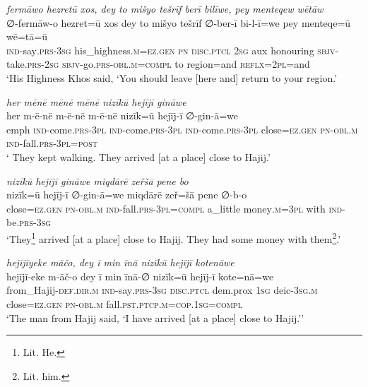 \ea \label{ŽP.91}
\textit{fermāwo hezretū xos, dey to mišyo tešrīf berī bilīwe, pey menteqew wētāw} \\ 
\gll ∅-fermāw-o hezret=ū xos dey to mišyo tešrīf ∅-ber-ī bi-l-ī=we pey menteqe=ū wē=tā=ū \\ 
 \textsc{ind-}say\textsc{.prs}\textsc{-3sg} his\_highness\textsc{.m}\textsc{\textsc{=ez.gen}} \textsc{pn} \textsc{disc.ptcl} \textsc{2sg} aux honouring \textsc{sbjv-}take\textsc{.prs}-\textsc{2sg} \textsc{sbjv-}go\textsc{.prs}\textsc{-obl}\textsc{.m}\textsc{=compl} to region=and \textsc{reflx}=\textsc{2pl}=and \\ 
\glt `His Highness Khos said, ‘You should leave [here and] return to your region.'
\z 
 
\ea \label{ŽP.100}
\textit{her mēnē mēnē mēnē nizīkū hejījī gināwe} \\ 
\gll her m-ē-nē m-ē-nē m-ē-nē nizīk=ū hejīj-ī ∅-gin-ā=we \\ 
 emph \textsc{ind-}come\textsc{.prs}\textsc{-3pl} \textsc{ind-}come\textsc{.prs}\textsc{-3pl} \textsc{ind-}come\textsc{.prs}\textsc{-3pl} close\textsc{\textsc{=ez.gen}} \textsc{pn}\textsc{-obl}\textsc{.m} \textsc{ind-}fall\textsc{.prs}\textsc{-3pl}\textsc{=\textsc{post}} \\ 
\glt ` They kept walking. They arrived [at a place] close to Hajij.'
\z 
 
\ea \label{ŽP.101}
\textit{nizīkū hejījī gināwe miqdārē zeřšā pene bo} \\ 
\gll nizīk=ū hejīj-ī ∅-gin-ā=we miqdārē zeř=šā pene ∅-b-o \\ 
 close\textsc{\textsc{=ez.gen}} \textsc{pn}\textsc{-obl}\textsc{.m} \textsc{ind-}fall\textsc{.prs}\textsc{-3pl}\textsc{=compl} a\_little money\textsc{.m}\textsc{=3pl} with \textsc{ind-}be\textsc{.prs}\textsc{-3sg} \\ 
\glt `They\footnote{Lit. He.} arrived [at a place] close to Hajij. They had some money with them\footnote{Lit. him.}.'
\z 
 
\ea \label{ŽP.102}
\textit{hejījīyeke māčo, dey ī min īnā nizīkū hejījī kotenāwe} \\ 
\gll hejījī-eke m-āč-o dey ī min īnā-∅ nizīk=ū hejīj-ī kote=nā=we \\ 
 from\_Hajij\textsc{-def}\textsc{.dir}\textsc{.m} \textsc{ind-}say\textsc{.prs}\textsc{-3sg} \textsc{disc.ptcl} dem.prox \textsc{1sg} deic\textsc{-3sg}\textsc{.m} close\textsc{\textsc{=ez.gen}} \textsc{pn}\textsc{-obl}\textsc{.m} fall\textsc{.pst}\textsc{.ptcp}\textsc{.m}\textsc{=cop}\textsc{.\textsc{1sg}}\textsc{=compl} \\ 
\glt `The man from Hajij said, ‘I have arrived [at a place] close to Hajij.’'
\z 
 
